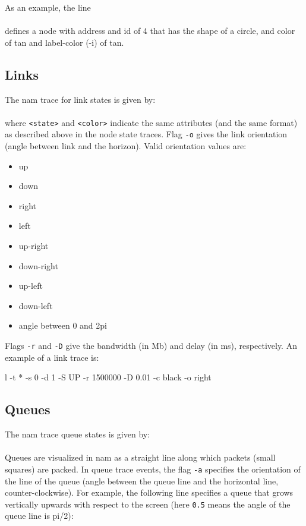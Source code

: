 As an example, the line\\
\\
defines a node with address and id of 4 that has the shape of a
circle, and color of tan and label-color (-i) of tan.

\subsection{Links}

The nam trace for link states is given by:\\
\\
where {\tt <state>} and {\tt <color>} indicate the same attributes
(and the same format) as described above in the node state traces. 
Flag {\tt -o} gives the link orientation (angle between link and
the horizon).  Valid orientation values are:
\begin{itemize}
\item up
\item down
\item right
\item left
\item up-right
\item down-right
\item up-left
\item down-left
\item angle between 0 and 2pi
\end{itemize}

Flags {\tt -r} and {\tt -D} give the bandwidth (in Mb) and delay (in
ms), respectively.
An example of a link trace is:
\begin{program}
l -t * -s 0 -d 1 -S UP -r 1500000 -D 0.01 -c black -o right
\end{program}


\subsection{Queues}

The nam trace queue states is given by:\\
\\
Queues are visualized in nam as a straight line along which packets
(small squares) are packed.
In queue trace events, the flag {\tt -a} specifies the orientation of the
line of the queue (angle between the queue line and the horizontal
line, counter-clockwise). 
For example, the following line specifies a queue that grows
vertically upwards with respect to the screen (here {\tt 0.5} means
the angle of the queue line is pi/2):

